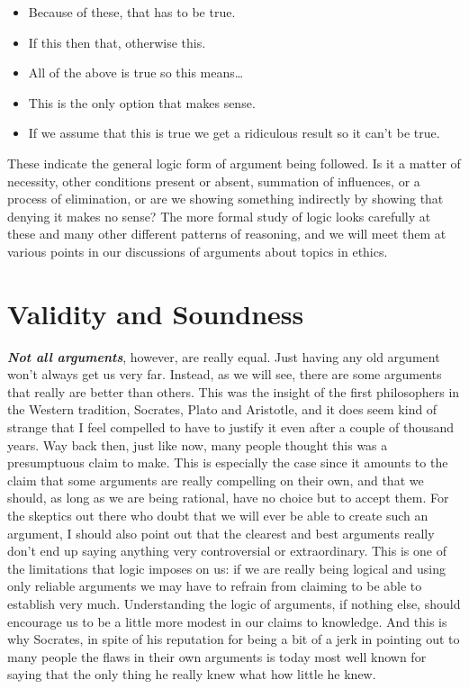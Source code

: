 \documentclass[12pt, openany]{book}
\makeatletter
\providecommand{\tightlist}{%
  \setlength{\itemsep}{0pt}\setlength{\parskip}{0pt}}
\newenvironment{kframe}{%
\medskip{}
\setlength{\fboxsep}{.8em}
 \def\at@end@of@kframe{}%
 \ifinner\ifhmode%
  \def\at@end@of@kframe{\end{minipage}}%
  \begin{minipage}{\columnwidth}%
 \fi\fi%
 \def\FrameCommand##1{\hskip\@totalleftmargin \hskip-\fboxsep
 \colorbox{shadecolor}{##1}\hskip-\fboxsep
     \hskip-\linewidth \hskip-\@totalleftmargin \hskip\columnwidth}%
 \MakeFramed {\advance\hsize-\width
   \@totalleftmargin\z@ \linewidth\hsize
   \@setminipage}}%
 {\par\unskip\endMakeFramed%
 \at@end@of@kframe}
\newenvironment{rmdblock}[1]
  {
  \begin{itemize}
  \renewcommand{\labelitemi}{
    \raisebox{-.7\height}[0pt][0pt]{
      {\setkeys{Gin}{width=3em,keepaspectratio}\texttt{[image: img/\#1]}}
    }
  }
  \setlength{\fboxsep}{1em}
  \begin{kframe}
  \item
  }
  {
  \end{kframe}
  \end{itemize}
  }
\newenvironment{note}
  {\begin{rmdblock}{note}}
  {\end{rmdblock}}
\makeatother
\begin{document}
\begin{note}

\begin{itemize}
\tightlist
\item
  Because of these, that has to be true.
\item
  If this then that, otherwise this.
\item
  All of the above is true so this means\ldots{}
\item
  This is the only option that makes sense.
\item
  If we assume that this is true we get a ridiculous result so it can't be true.
\end{itemize}

\end{note}

These indicate the general logic form of argument being followed. Is it a matter of necessity, other conditions present or absent, summation of influences, or a process of elimination, or are we showing something indirectly by showing that denying it makes no sense? The more formal study of logic looks carefully at these and many other different patterns of reasoning, and we will meet them at various points in our discussions of arguments about topics in ethics.

\hypertarget{validity-and-soundness}{%
\section{Validity and Soundness}\label{validity-and-soundness}}

\textbf{\emph{Not all arguments}}, however, are really equal. Just having any old argument won't always get us very far. Instead, as we will see, there are some arguments that really are better than others. This was the insight of the first philosophers in the Western tradition, Socrates, Plato and Aristotle, and it does seem kind of strange that I feel compelled to have to justify it even after a couple of thousand years. Way back then, just like now, many people thought this was a presumptuous claim to make. This is especially the case since it amounts to the claim that some arguments are really compelling on their own, and that we should, as long as we are being rational, have no choice but to accept them. For the skeptics out there who doubt that we will ever be able to create such an argument, I should also point out that the clearest and best arguments really don't end up saying anything very controversial or extraordinary. This is one of the limitations that logic imposes on us: if we are really being logical and using only reliable arguments we may have to refrain from claiming to be able to establish very much. Understanding the logic of arguments, if nothing else, should encourage us to be a little more modest in our claims to knowledge. And this is why Socrates, in spite of his reputation for being a bit of a jerk in pointing out to many people the flaws in their own arguments is today most well known for saying that the only thing he really knew what how little he knew.
\end{document}
